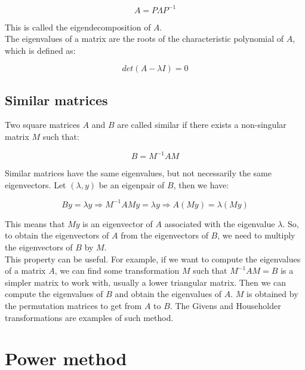 \begin{equation}
    A = P \Lambda P^{-1}
\end{equation}

This is called the eigendecomposition of $A$.\\

The eigenvalues of a matrix are the roots of the characteristic polynomial of $A$, which is defined as:

\begin{equation}
    det(A - \lambda I) = 0
\end{equation}

\subsection{Similar matrices}

Two square matrices $A$ and $B$ are called similar if there exists a non-singular matrix $M$ such that:

\begin{equation}
    B = M^{-1} A M
\end{equation}

Similar matrices have the same eigenvalues, but not necessarily the same eigenvectors. Let $(\lambda, y)$ be 
an eigenpair of $B$, then we have:

\begin{equation}
    B y = \lambda y \Rightarrow M^{-1} A M y = \lambda y \Rightarrow A (M y) = \lambda (M y)
\end{equation}

This means that $M y$ is an eigenvector of $A$ associated with the eigenvalue $\lambda$. So, to obtain
the eigenvectors of $A$ from the eigenvectors of $B$, we need to multiply the eigenvectors of $B$ by $M$.\\

This property can be useful. For example, if we want to compute the eigenvalues of a matrix $A$, we can find
some transformation $M$ such that $M^{-1} A M = B$ is a simpler matrix to work with, usually a lower triangular
matrix. Then we can compute the eigenvalues of $B$ and obtain the eigenvalues of $A$. $M$ is obtained by the permutation
matrices to get from $A$ to $B$. The Givens and Householder transformations are examples of such method.

\section{Power method}

